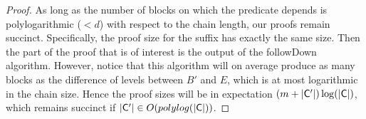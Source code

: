 \begin{proof}
As long as the number of blocks on which the predicate depends is
polylogarithmic ($< d$) with respect to the chain length, our proofs remain
succinct. Specifically, the proof size for the suffix has exactly the same size.
Then the part of the proof that is of interest is the output of the
\textsf{followDown} algorithm. However, notice that this algorithm will on
average produce as many blocks as the difference of levels between $B'$ and $E$,
which is at most logarithmic in the chain size. Hence the proof sizes will be in
expectation $(m + |\mathsf{C}'|)\log(|\mathsf{C}|)$, which remains succinct if
$|\mathsf{C}'| \in O(polylog(|\mathsf{C}|))$.
\end{proof}
